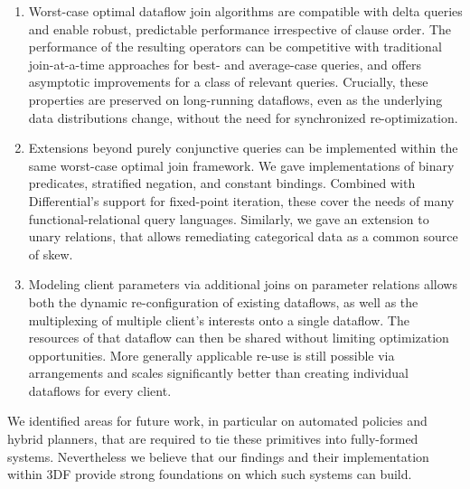 \documentclass{article}
\begin{document}
\begin{enumerate}
\item
  Worst-case optimal dataflow join algorithms are compatible with
  delta queries and enable robust, predictable performance
  irrespective of clause order. The performance of the resulting
  operators can be competitive with traditional join-at-a-time
  approaches for best- and average-case queries, and offers asymptotic
  improvements for a class of relevant queries. Crucially, these
  properties are preserved on long-running dataflows, even as the
  underlying data distributions change, without the need for
  synchronized re-optimization.

\item
  Extensions beyond purely conjunctive queries can be implemented
  within the same worst-case optimal join framework. We gave
  implementations of binary predicates, stratified negation, and
  constant bindings. Combined with Differential's support for
  fixed-point iteration, these cover the needs of many
  functional-relational query languages. Similarly, we gave an
  extension to unary relations, that allows remediating categorical
  data as a common source of skew.

\item
  Modeling client parameters via additional joins on parameter
  relations allows both the dynamic re-configuration of existing
  dataflows, as well as the multiplexing of multiple client's
  interests onto a single dataflow. The resources of that dataflow can
  then be shared without limiting optimization opportunities. More
  generally applicable re-use is still possible via arrangements and
  scales significantly better than creating individual dataflows for
  every client.

\end{enumerate}

We identified areas for future work, in particular on automated
policies and hybrid planners, that are required to tie these
primitives into fully-formed systems. Nevertheless we believe that our
findings and their implementation within 3DF provide strong
foundations on which such systems can build.

\newpage



\end{document}
